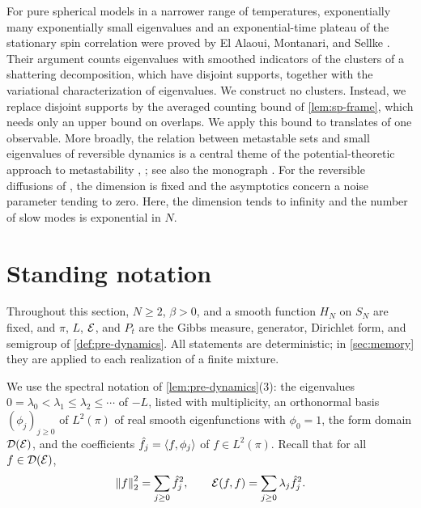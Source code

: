For pure spherical models in a narrower range of temperatures, exponentially many exponentially small eigenvalues and an exponential-time plateau of the stationary spin correlation were proved by El Alaoui, Montanari, and Sellke \cite[Corollaries~2.8 and~2.9]{ElAlaouiMontanariSellke2025}.
Their argument counts eigenvalues with smoothed indicators of the clusters of a shattering decomposition, which have disjoint supports, together with the variational characterization of eigenvalues. We construct no clusters. Instead, we replace disjoint supports by the averaged counting bound of \cref{lem:sp-frame}, which needs only an upper bound on overlaps. We apply this bound to translates of one observable. More broadly, the relation between metastable sets and small eigenvalues of reversible dynamics is a central theme of the potential-theoretic approach to metastability \cite[Theorem~1.3]{BovierEckhoffGayrardKlein2002}, \cite[Theorem~1.2]{BovierGayrardKlein2005}; see also the monograph \cite{BovierDenHollander2015}. For the reversible diffusions of \cite[Theorem~1.2]{BovierGayrardKlein2005}, the dimension is fixed and the asymptotics concern a noise parameter tending to zero. Here, the dimension tends to infinity and the number of slow modes is exponential in $N$.

\section{Standing notation}\label{sec:sp-notation}

Throughout this section, $N\ge2$, $\beta>0$, and a smooth function $H_N$ on $S_N$ are fixed, and $\pi$, $L$, $\mathcal E$, and $P_t$ are the Gibbs measure, generator, Dirichlet form, and semigroup of \cref{def:pre-dynamics}. All statements are deterministic; in \cref{sec:memory} they are applied to each realization of a finite mixture.

We use the spectral notation of \cref{lem:pre-dynamics}(3): the eigenvalues $0=\lambda_0<\lambda_1\le\lambda_2\le\cdots$ of $-L$, listed with multiplicity, an orthonormal basis $(\phi_j)_{j\ge0}$ of $L^2(\pi)$ of real smooth eigenfunctions with $\phi_0=1$, the form domain $\mathcal D(\mathcal E)$, and the coefficients $\hat f_j=\langle f,\phi_j\rangle$ of $f\in L^2(\pi)$. Recall that for all $f\in\mathcal D(\mathcal E)$,
\begin{equation}\label{eq:sp-parseval}
\left\lVert f\right\rVert_2^2=\sum_{j\ge0}\hat f_j^2,\qquad \mathcal E(f,f)=\sum_{j\ge0}\lambda_j\hat f_j^2.
\end{equation}

